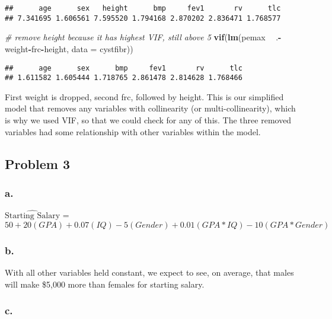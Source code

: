 \documentclass[]{article}
\newenvironment{Shaded}{\begin{snugshade}}{\end{snugshade}}
\newcommand{\CommentTok}[1]{\textcolor[rgb]{0.56,0.35,0.01}{\textit{#1}}}
\newcommand{\DataTypeTok}[1]{\textcolor[rgb]{0.13,0.29,0.53}{#1}}
\newcommand{\KeywordTok}[1]{\textcolor[rgb]{0.13,0.29,0.53}{\textbf{#1}}}
\newcommand{\NormalTok}[1]{#1}
\newcommand{\OperatorTok}[1]{\textcolor[rgb]{0.81,0.36,0.00}{\textbf{#1}}}
\newcommand{\StringTok}[1]{\textcolor[rgb]{0.31,0.60,0.02}{#1}}
\begin{document}
\begin{verbatim}
##      age      sex   height      bmp     fev1       rv      tlc 
## 7.341695 1.606561 7.595520 1.794168 2.870202 2.836471 1.768577
\end{verbatim}

\begin{Shaded}
\begin{Highlighting}[]
\CommentTok{# remove height because it has highest VIF, still above 5}
\KeywordTok{vif}\NormalTok{(}\KeywordTok{lm}\NormalTok{(pemax }\OperatorTok{~}\StringTok{ }\NormalTok{.}\OperatorTok{-}\NormalTok{weight}\OperatorTok{-}\NormalTok{frc}\OperatorTok{-}\NormalTok{height, }\DataTypeTok{data =}\NormalTok{ cystfibr))}
\end{Highlighting}
\end{Shaded}

\begin{verbatim}
##      age      sex      bmp     fev1       rv      tlc 
## 1.611582 1.605444 1.718765 2.861478 2.814628 1.768466
\end{verbatim}

First weight is dropped, second frc, followed by height. This is our
simplified model that removes any variables with collinearity (or
multi-collinearity), which is why we used VIF, so that we could check
for any of this. The three removed variables had some relationship with
other variables within the model.

\hypertarget{problem-3}{%
\subsection{Problem 3}\label{problem-3}}

\hypertarget{a.-1}{%
\subsubsection{a.}\label{a.-1}}

\(\hat{\text{Starting Salary}}\) =
\(50 + 20(GPA) + 0.07(IQ) - 5(Gender) + 0.01(GPA*IQ) - 10(GPA*Gender)\)

\hypertarget{b.-1}{%
\subsubsection{b.}\label{b.-1}}

With all other variables held constant, we expect to see, on average,
that males will make \$5,000 more than females for starting salary.

\hypertarget{c.}{%
\subsubsection{c.}\label{c.}}
\end{document}
